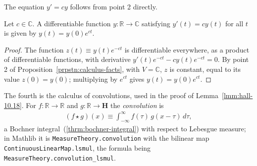 The equation $y' = cy$ follows from point 2 directly.

\begin{lemma}[The Equation $y' = cy$]
    \label{lmm:linear-ode-scalar}
    \leanok
    Let $c \in \mathbb{C}$. A differentiable function $y : \mathbb{R} \rightarrow \mathbb{C}$ satisfying $y'(t) = cy(t)$ for all $t$ is given by $y(t) = y(0)e^{ct}$.
\end{lemma}
\begin{proof}
    \leanok
The function $z(t) \equiv y(t)e^{-ct}$ is differentiable everywhere, as a product of differentiable functions, with derivative $y'(t)e^{-ct} - cy(t)e^{-ct} = 0$. By point 2 of Proposition~\ref{prpstn:calculus-facts}, with $V = \mathbb{C}$, $z$ is constant, equal to its value $z(0) = y(0)$; multiplying by $e^{ct}$ gives $y(t) = y(0)e^{ct}$.
\end{proof}

The fourth is the calculus of convolutions, used in the proof of Lemma~\ref{lmm:hall-10.18}. For $f : \mathbb{R} \rightarrow \mathbb{R}$ and $g : \mathbb{R} \rightarrow \mathbf{H}$ the \textit{convolution} is
\begin{align}
    (f \star g)(x) \equiv \int_{-\infty}^{\infty} f(\tau)\, g(x - \tau) \, d\tau,
\end{align}
a Bochner integral~(\ref{thrm:bochner-integral}) with respect to Lebesgue measure; in Mathlib it is \texttt{MeasureTheory.convolution} with the bilinear map \texttt{ContinuousLinearMap.lsmul}, the formula being \texttt{MeasureTheory.convolution\_lsmul}.


